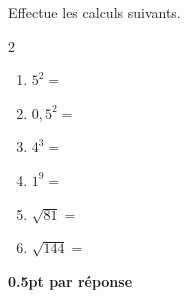 
\question[3]
Effectue les calculs suivants.	

\vspace{10pt}
\setlength{\columnsep}{50pt}
\begin{multicols}{2}
\begin{enumerate}[leftmargin=*,align=parleft, label=\alph*), itemsep=25pt]
\item $5^2 =$ 
\item $0,5^2=$ 
\item $4^3=$ 
\item $1^9=$ 
\item $\sqrt{81}=$ 
\item $\sqrt{144}=$ 
\end{enumerate}
\end{multicols}
\setlength{\columnsep}{10pt}

\begin{solution}[0pt]
\textbf{0.5pt par réponse}
\end{solution}